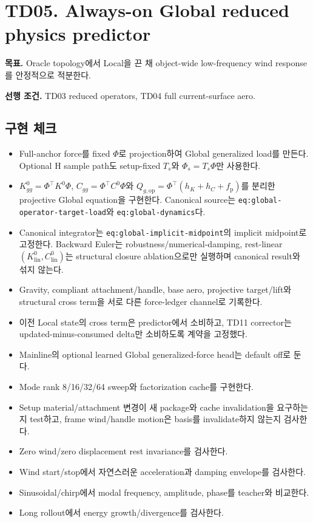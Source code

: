\documentclass[10pt,a4paper]{article}
\newcommand{\todo}{\textcolor{TodoGray}{\(\square\)}}
\newcommand{\done}{\textcolor{DoneGreen}{\(\boxtimes\)}}
\newcommand{\code}[1]{\texttt{#1}}
\begin{document}
\section{TD05. Always-on Global reduced physics predictor}

\textbf{목표.}
Oracle topology에서 Local을 끈 채 object-wide low-frequency wind response를 안정적으로 적분한다.

\textbf{선행 조건.} TD03 reduced operators, TD04 full current-surface aero.

\subsection*{구현 체크}

\begin{itemize}
  \item[\todo] Full-anchor force를 fixed \(\Phi\)로 projection하여 Global generalized load를 만든다.
  Optional H sample path도 setup-fixed \(T_s\)와 \(\Phi_s=T_s\Phi\)만 사용한다.
  \item[\todo] \(K_{gg}^0=\Phi^\top K^0\Phi\),
  \(C_{gg}=\Phi^\top C^0\Phi\)와
  \(Q_{g,\mathrm{op}}=\Phi^\top(h_K+h_C+f_{\mathrm p})\)를 분리한
  projective Global equation을 구현한다. Canonical source는
  \code{eq:global-operator-target-load}와 \code{eq:global-dynamics}다.
  \item[\todo] Canonical integrator는 \code{eq:global-implicit-midpoint}의
  implicit midpoint로 고정한다. Backward Euler는 robustness/numerical-damping,
  rest-linear \((K_{\mathrm{lin}}^0,C_{\mathrm{lin}}^0)\)는 structural closure ablation으로만 실행하며
  canonical result와 섞지 않는다.
  \item[\todo] Gravity, compliant attachment/handle, base aero, projective target/lift와
  structural cross term을 서로 다른 force-ledger channel로 기록한다.
  \item[\done] 이전 Local state의 cross term은 predictor에서 소비하고, TD11 corrector는 updated-minus-consumed delta만 소비하도록 계약을 고정했다.
  \item[\todo] Mainline의 optional learned Global generalized-force head는 default off로 둔다.
  \item[\todo] Mode rank 8/16/32/64 sweep와 factorization cache를 구현한다.
  \item[\todo] Setup material/attachment 변경이 새 package와 cache invalidation을 요구하는지 test하고, frame wind/handle motion은 basis를 invalidate하지 않는지 검사한다.
  \item[\todo] Zero wind/zero displacement rest invariance를 검사한다.
  \item[\todo] Wind start/stop에서 자연스러운 acceleration과 damping envelope를 검사한다.
  \item[\todo] Sinusoidal/chirp에서 modal frequency, amplitude, phase를 teacher와 비교한다.
  \item[\todo] Long rollout에서 energy growth/divergence를 검사한다.
\end{itemize}
\end{document}
